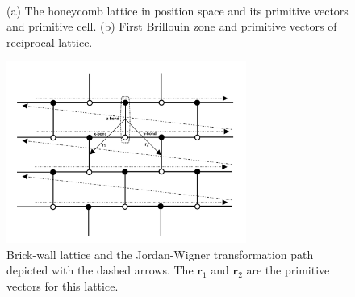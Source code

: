 \documentclass{article}
\begin{document}
\begin{figure}[h!]
     \centering
    \\
    \caption{(a) The honeycomb lattice in position space and its primitive vectors and primitive cell. (b) First Brillouin zone and primitive vectors of reciprocal lattice.}
    \label{fig:fig0}
\end{figure}

\begin{figure}[h!]
	\centering
	\includegraphics[width=0.7\textwidth]{./images/Jor-Wig}
	\caption{\label{jor} Brick-wall lattice and the Jordan-Wigner transformation path depicted with the dashed arrows. The $\textbf{r}_1$ and $\textbf{r}_2$ are the primitive vectors for this lattice.} 
	\label{fig:fig01}
\end{figure}
\end{document}
